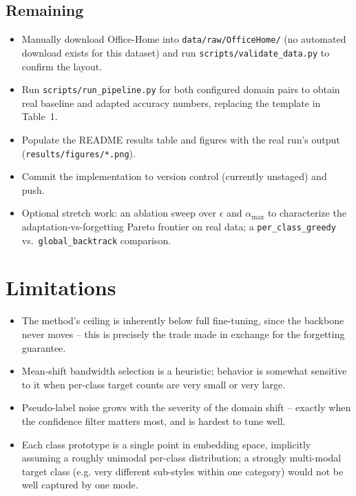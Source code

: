 \documentclass[11pt]{article}
\begin{document}
\subsection*{Remaining}
\begin{itemize}[leftmargin=1.4em]
\item Manually download Office-Home into \texttt{data/raw/OfficeHome/} (no automated download
exists for this dataset) and run \texttt{scripts/validate\_data.py} to confirm the layout.
\item Run \texttt{scripts/run\_pipeline.py} for both configured domain pairs to obtain real
baseline and adapted accuracy numbers, replacing the template in Table~1.
\item Populate the README results table and figures with the real run's output
(\texttt{results/figures/*.png}).
\item Commit the implementation to version control (currently unstaged) and push.
\item Optional stretch work: an ablation sweep over $\epsilon$ and $\alpha_{\max}$ to
characterize the adaptation-vs-forgetting Pareto frontier on real data; a
\texttt{per\_class\_greedy} vs.\ \texttt{global\_backtrack} comparison.
\end{itemize}

\section{Limitations}

\begin{itemize}[leftmargin=1.4em]
\item The method's ceiling is inherently below full fine-tuning, since the backbone never moves
-- this is precisely the trade made in exchange for the forgetting guarantee.
\item Mean-shift bandwidth selection is a heuristic; behavior is somewhat sensitive to it when
per-class target counts are very small or very large.
\item Pseudo-label noise grows with the severity of the domain shift -- exactly when the
confidence filter matters most, and is hardest to tune well.
\item Each class prototype is a single point in embedding space, implicitly assuming a roughly
unimodal per-class distribution; a strongly multi-modal target class (e.g. very different
sub-styles within one category) would not be well captured by one mode.
\end{itemize}
\end{document}
